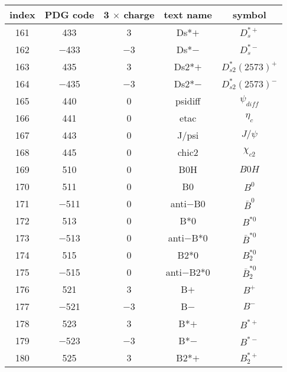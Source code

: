 \documentclass{article}
\begin{document}
\clearpage

\begin{table}[!htbp]
\centering
\begin{tabular}{|c|c|c|c|c|}
\hline
index & PDG code & 3 $\times$ charge & text name & symbol \\
\hline
161 & 433 & 3 & D\underline{\hspace{0.6em}}s*$+$ & $D_{s}^{*+}$ \\
\hline
162 & $-$433 & $-$3 & D\underline{\hspace{0.6em}}s*$-$ & $D_{s}^{*-}$ \\
\hline
163 & 435 & 3 & D\underline{\hspace{0.6em}}s2*$+$ & $D_{s2}^{*}(2573)^{+}$ \\
\hline
164 & $-$435 & $-$3 & D\underline{\hspace{0.6em}}s2*$-$ & $D_{s2}^{*}(2573)^{-}$ \\
\hline
165 & 440 & 0 & psi\underline{\hspace{0.6em}}diff & $\psi_{diff}$ \\
\hline
166 & 441 & 0 & eta\underline{\hspace{0.6em}}c & $\eta_{c}$ \\
\hline
167 & 443 & 0 & J/psi & $J/\psi$ \\
\hline
168 & 445 & 0 & chi\underline{\hspace{0.6em}}c2 & $\chi_{c2}$ \\
\hline
169 & 510 & 0 & B0H & $B0H$ \\
\hline
170 & 511 & 0 & B0 & $B^{0}$ \\
\hline
171 & $-$511 & 0 & anti$-$B0 & $\bar{B}^{0}$ \\
\hline
172 & 513 & 0 & B*0 & $B^{*0}$ \\
\hline
173 & $-$513 & 0 & anti$-$B*0 & $\bar{B}^{*0}$ \\
\hline
174 & 515 & 0 & B\underline{\hspace{0.6em}}2*0 & $B_{2}^{*0}$ \\
\hline
175 & $-$515 & 0 & anti$-$B\underline{\hspace{0.6em}}2*0 & $\bar{B}_{2}^{*0}$ \\
\hline
176 & 521 & 3 & B$+$ & $B^{+}$ \\
\hline
177 & $-$521 & $-$3 & B$-$ & $B^{-}$ \\
\hline
178 & 523 & 3 & B*$+$ & $B^{*+}$ \\
\hline
179 & $-$523 & $-$3 & B*$-$ & $B^{*-}$ \\
\hline
180 & 525 & 3 & B\underline{\hspace{0.6em}}2*$+$ & $B_{2}^{*+}$ \\

\end{tabular}
\end{table}
\end{document}
